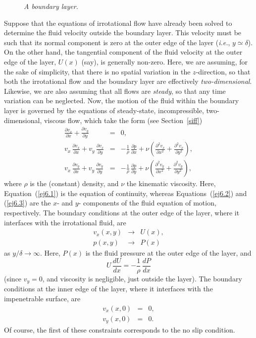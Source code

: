 \begin{figure}
\epsfysize=2.5in
\centerline{}
\caption{\em A boundary layer.}\label{fbl}
\end{figure}

Suppose that the equations of irrotational flow have already been solved to determine the fluid velocity outside the boundary 
layer. This velocity must be such that its normal component is zero at the outer edge of the layer ({\em i.e.}, $y\simeq \delta$). On the other hand, the tangential component of the fluid velocity at the outer edge of the layer, $U(x)$ (say), is generally non-zero. 
Here, we are assuming, for the sake of simplicity, that there is no spatial variation in the $z$-direction, so
that both the irrotational flow and the boundary layer are effectively {\em two-dimensional}. 
Likewise, we are also assuming that all flows are {\em steady}, so that any time variation can be neglected. 
Now, the motion of the fluid within the boundary layer is governed by the equations of steady-state, incompressible,
two-dimensional, viscous flow, which take the form (see Section~\ref{siff})
\begin{eqnarray}
\frac{\partial v_x}{\partial x} +\frac{\partial v_y}{\partial y} &=& 0,\label{ej6.1}\\[0.5ex]
v_x\,\frac{\partial v_x}{\partial x} + v_y\,\frac{\partial v_x}{\partial y} &=&-\frac{1}{\rho}\,\frac{\partial p}{\partial x}
+ \nu\left(\frac{\partial^2 v_x}{\partial x^2}+\frac{\partial^2 v_x}{\partial y^2}\right),\label{ej6.2}\\[0.5ex]
v_x\,\frac{\partial v_y}{\partial x} + v_y\,\frac{\partial v_y}{\partial y} &=&-\frac{1}{\rho}\,\frac{\partial p}{\partial y}
+ \nu\left(\frac{\partial^2 v_y}{\partial x^2}+\frac{\partial^2 v_y}{\partial y^2}\right),\label{ej6.3}
\end{eqnarray}
where $\rho$ is the (constant) density, and $\nu$ the kinematic viscosity. Here, Equation~(\ref{ej6.1}) is the
equation of continuity, whereas Equations~(\ref{ej6.2}) and (\ref{ej6.3}) are the $x$- and $y$- components of the fluid equation of motion,
respectively. The boundary conditions at the outer edge of the layer, where it interfaces with the irrotational
fluid, are
\begin{eqnarray}
v_x(x,y)&\rightarrow & U(x),\\[0.5ex]
p(x,y)&\rightarrow & P(x)
\end{eqnarray}
as $y/\delta\rightarrow \infty$. Here, $P(x)$ is the fluid pressure at the outer edge of the layer, and 
\begin{equation}\label{ej6.7}
U\,\frac{dU}{dx} = - \frac{1}{\rho}\,\frac{dP}{dx}
\end{equation}
(since $v_y=0$, and viscosity is negligible, just outside the layer).
The boundary conditions at the inner edge of the layer, where it interfaces with the impenetrable surface, are
\begin{eqnarray}
v_x(x,0) &=&0,\\[0.5ex]
v_y(x,0)&=&0.
\end{eqnarray}
Of course, the first of these constraints corresponds to the no slip condition. 

